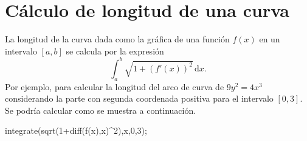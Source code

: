 
\section{Cálculo de longitud de una curva}
La longitud de la curva dada como la gráfica de una función
$f(x)$
en un intervalo
$[a,b]$
se calcula por la expresión
\begin{equation*}
 \int_{a}^{b} \sqrt{1+\left(f'(x)\right)^2}\,\mathrm{d}x.
\end{equation*}
Por ejemplo, para calcular la longitud del arco de curva de
$9y^2 = 4x^3$ considerando la parte con segunda coordenada positiva
para el intervalo $[0,3]$.
Se podría calcular como se muestra a continuación.
\begin{maximai}
 integrate(sqrt(1+diff(f(x),x)^2),x,0,3);
\end{maximai}\begin{maximao}
\end{maximao}
